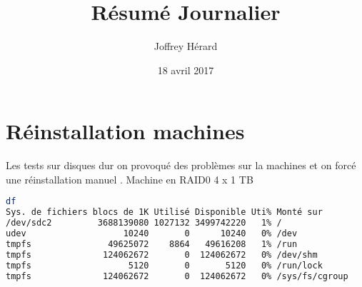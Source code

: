 \documentclass[french]{article}
\begin{document}
\title{Résumé Journalier}
\author{Joffrey Hérard}
\date{18 avril 2017} 

\maketitle
\section{Réinstallation machines}
Les tests sur disques dur on provoqué des problèmes sur la machines et on forcé une réinstallation manuel .
Machine en RAID0 
4 x 1 TB
\begin{lstlisting}[language=bash,caption={df}]
df
Sys. de fichiers blocs de 1K Utilisé Disponible Uti% Monté sur
/dev/sdc2         3688139080 1027132 3499742220   1% /
udev                   10240       0      10240   0% /dev
tmpfs               49625072    8864   49616208   1% /run
tmpfs              124062672       0  124062672   0% /dev/shm
tmpfs                   5120       0       5120   0% /run/lock
tmpfs              124062672       0  124062672   0% /sys/fs/cgroup

\end{lstlisting}
\newpage
\end{document}
